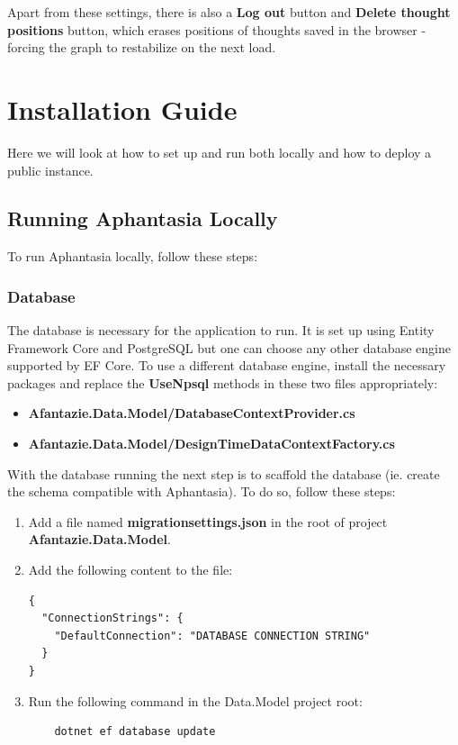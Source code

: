 Apart from these settings, there is also a \textbf{Log out} button
and \textbf{Delete thought positions} button, which erases positions of thoughts saved in the browser - forcing the graph to restabilize on the next load.

\section{Installation Guide}
Here we will look at how to set up and run both locally and how to deploy a public instance. 

\subsection{Running Aphantasia Locally}
To run Aphantasia locally, follow these steps:

\subsubsection{Database}
The database is necessary for the application to run.
It is set up using Entity Framework Core and PostgreSQL but one can choose any other database engine supported by EF Core.
To use a different database engine, install the necessary packages
and replace the \textbf{UseNpsql} methods in these two files appropriately:
\begin{itemize}
  \item \textbf{Afantazie.Data.Model/DatabaseContextProvider.cs}
  \item \textbf{Afantazie.Data.Model/DesignTimeDataContextFactory.cs}
\end{itemize}

With the database running the next step is to scaffold the database (ie. create the schema compatible with Aphantasia).
To do so, follow these steps:
\begin{enumerate}
  \item Add a file named \textbf{migrationsettings.json} in the root of project \textbf{Afantazie.Data.Model}.
  \item Add the following content to the file:
  \begin{lstlisting}
{
  "ConnectionStrings": {
    "DefaultConnection": "DATABASE CONNECTION STRING"
  }
}
  \end{lstlisting}
  \item Run the following command in the Data.Model project root:
  \begin{lstlisting}
    dotnet ef database update
  \end{lstlisting}
\end{enumerate}

